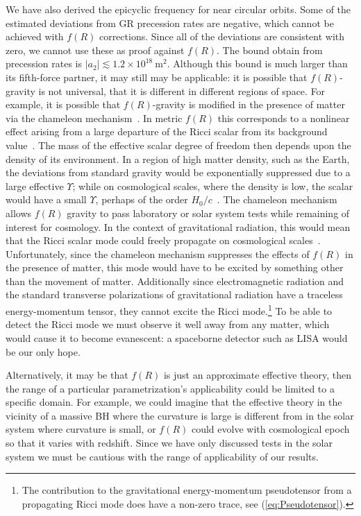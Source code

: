 \documentclass[aps,prd,amsfonts,amssymb,amsmath,nofootinbib,reprint,showpacs]{revtex4-1}
\newcommand{\eqnref}[1]{(\ref{eq:#1})}
\newcommand{\units}[1]{\ensuremath{~\mathrm{#1}}}
\begin{document}
We have also derived the epicyclic frequency for near circular orbits. Some of the estimated deviations from GR precession rates are negative, which cannot be achieved with $f(R)$ corrections. Since all of the deviations are consistent with zero, we cannot use these as proof against $f(R)$. The bound obtain from precession rates is $|a_2| \lesssim 1.2 \times 10^{18}\units{m^2}$. Although this bound is much larger than its fifth-force partner, it may still may be applicable: it is possible that $f(R)$-gravity is not universal, that it is different in different regions of space. For example, it is possible that $f(R)$-gravity is modified in the presence of matter via the chameleon mechanism~\cite{Khoury2004, Khoury2004a}. In metric $f(R)$ this corresponds to a nonlinear effect arising from a large departure of the Ricci scalar from its background value~\cite{DeFelice2010}. The mass of the effective scalar degree of freedom then depends upon the density of its environment. In a region of high matter density, such as the Earth, the deviations from standard gravity would be exponentially suppressed due to a large effective $\Upsilon$; while on cosmological scales, where the density is low, the scalar would have a small $\Upsilon$, perhaps of the order $H_0/c$~\cite{Khoury2004, Khoury2004a}. The chameleon mechanism allows $f(R)$ gravity to pass laboratory or solar system tests while remaining of interest for cosmology. In the context of gravitational radiation, this would mean that the Ricci scalar mode could freely propagate on cosmological scales~\cite{Corda2009}. Unfortunately, since the chameleon mechanism suppresses the effects of $f(R)$ in the presence of matter, this mode would have to be excited by something other than the movement of matter. Additionally since electromagnetic radiation and the standard transverse polarizations of gravitational radiation have a traceless energy-momentum tensor, they cannot excite the Ricci mode.\footnote{The contribution to the gravitational energy-momentum pseudotensor from a propagating Ricci mode does have a non-zero trace, see \eqnref{Pseudotensor}.} To be able to detect the Ricci mode we must observe it well away from any matter, which would cause it to become evanescent: a spaceborne detector such as LISA would be our only hope.

Alternatively, it may be that $f(R)$ is just an approximate effective theory, then the range of a particular parametrization's applicability could be limited to a specific domain. For example, we could imagine that the effective theory in the vicinity of a massive BH where the curvature is large is different from in the solar system where curvature is small, or $f(R)$ could evolve with cosmological epoch so that it varies with redshift. Since we have only discussed tests in the solar system we must be cautious with the range of applicability of our results.
\end{document}
